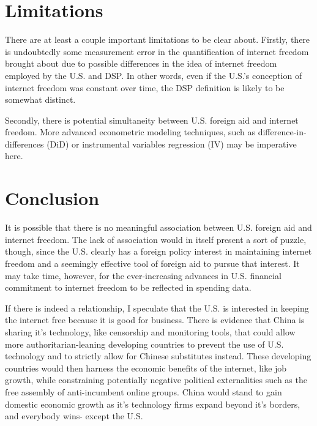 \section*{Limitations}
There are at least a couple important limitations to be clear about. Firstly, there is undoubtedly some measurement error in the quantification of internet freedom brought about due to possible differences in the idea of internet freedom employed by the U.S. and DSP. In other words, even if the U.S.'s conception of internet freedom was constant over time, the DSP definition is likely to be somewhat distinct.

Secondly, there is potential simultaneity between U.S. foreign aid and internet freedom. More advanced econometric modeling techniques, such as difference-in-differences (DiD) or instrumental variables regression (IV) may be imperative here. 

\section*{Conclusion}
It is possible that there is no meaningful association between U.S. foreign aid and internet freedom. The lack of association would in itself present a sort of puzzle, though, since the U.S. clearly has a foreign policy interest in maintaining internet freedom and a seemingly effective tool of foreign aid to pursue that interest. It may take time, however, for the ever-increasing advances in U.S. financial commitment to internet freedom to be reflected in spending data.  

If there is indeed a relationship, I speculate that the U.S. is interested in keeping the internet free because it is good for business. There is evidence that China is sharing it's technology, like censorship and monitoring tools, that could allow more authoritarian-leaning developing countries to prevent the use of U.S. technology and to strictly allow for Chinese substitutes instead. These developing countries would then harness the economic benefits of the internet, like job growth, while constraining potentially negative political externalities such as the free assembly of anti-incumbent online groups. China would stand to gain domestic economic growth as it's technology firms expand beyond it's borders, and everybody wins- except the U.S.
